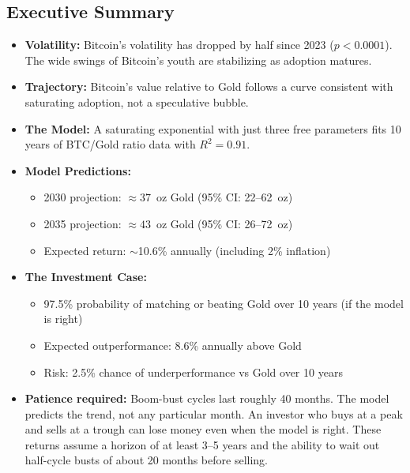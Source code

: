 \documentclass[11pt,letterpaper]{article}
\begin{document}
\enlargethispage{4\baselineskip}
\begin{mdframed}[linewidth=1.5pt,linecolor=black!60,backgroundcolor=gray!5,
  innertopmargin=4pt,innerbottommargin=4pt,skipabove=6pt,skipbelow=6pt]
\subsection*{Executive Summary}
\begin{itemize}[leftmargin=*]
    \item \textbf{Volatility:} Bitcoin's volatility has dropped by half since 2023 ($p < 0.0001$). The wide swings of Bitcoin's youth are stabilizing as adoption matures.
    \item \textbf{Trajectory:} Bitcoin's value relative to Gold follows a curve consistent with saturating adoption, not a speculative bubble.
    \item \textbf{The Model:} A saturating exponential with just three free parameters fits 10 years of BTC/Gold ratio data with $R^2 = 0.91$.
    \item \textbf{Model Predictions:}
    \begin{itemize}
        \item 2030 projection: $\approx 37$~oz Gold (95\% CI: 22--62~oz)
        \item 2035 projection: $\approx 43$~oz Gold (95\% CI: 26--72~oz)
        \item Expected return: $\sim$10.6\% annually (including 2\% inflation)
    \end{itemize}
    \item \textbf{The Investment Case:}
    \begin{itemize}
        \item 97.5\% probability of matching or beating Gold over 10 years (if the model is right)
        \item Expected outperformance: 8.6\% annually above Gold
        \item Risk: 2.5\% chance of underperformance vs Gold over 10 years
    \end{itemize}
    \item \textbf{Patience required:} Boom-bust cycles last roughly 40 months. The model predicts the trend, not any particular month. An investor who buys at a peak and sells at a trough can lose money even when the model is right. These returns assume a horizon of at least 3--5 years and the ability to wait out half-cycle busts of about 20 months before selling.
\end{itemize}
\end{mdframed}
\end{document}
